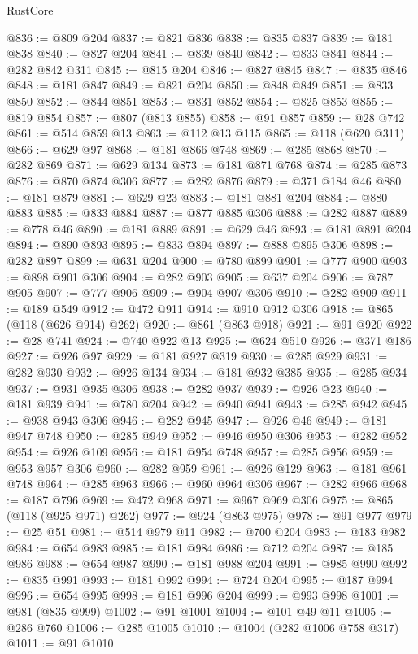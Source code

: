 \begin{lexlean}{RustCore}
\begin{coremodule}
@836 := @809 @204
@837 := @821 @836
@838 := @835 @837
@839 := @181 @838
@840 := @827 @204
@841 := @839 @840
@842 := @833 @841
@844 := @282 @842 @311
@845 := @815 @204
@846 := @827 @845
@847 := @835 @846
@848 := @181 @847
@849 := @821 @204
@850 := @848 @849
@851 := @833 @850
@852 := @844 @851
@853 := @831 @852
@854 := @825 @853
@855 := @819 @854
@857 := @807 (@813 @855)
@858 := @91 @857
@859 := @28 @742
@861 := @514 @859 @13
@863 := @112 @13 @115
@865 := @118 (@620 @311)
@866 := @629 @97
@868 := @181 @866 @748
@869 := @285 @868
@870 := @282 @869
@871 := @629 @134
@873 := @181 @871 @768
@874 := @285 @873
@876 := @870 @874 @306
@877 := @282 @876
@879 := @371 @184 @46
@880 := @181 @879
@881 := @629 @23
@883 := @181 @881 @204
@884 := @880 @883
@885 := @833 @884
@887 := @877 @885 @306
@888 := @282 @887
@889 := @778 @46
@890 := @181 @889
@891 := @629 @46
@893 := @181 @891 @204
@894 := @890 @893
@895 := @833 @894
@897 := @888 @895 @306
@898 := @282 @897
@899 := @631 @204
@900 := @780 @899
@901 := @777 @900
@903 := @898 @901 @306
@904 := @282 @903
@905 := @637 @204
@906 := @787 @905
@907 := @777 @906
@909 := @904 @907 @306
@910 := @282 @909
@911 := @189 @549
@912 := @472 @911
@914 := @910 @912 @306
@918 := @865 (@118 (@626 @914) @262)
@920 := @861 (@863 @918)
@921 := @91 @920
@922 := @28 @741
@924 := @740 @922 @13
@925 := @624 @510
@926 := @371 @186
@927 := @926 @97
@929 := @181 @927 @319
@930 := @285 @929
@931 := @282 @930
@932 := @926 @134
@934 := @181 @932 @385
@935 := @285 @934
@937 := @931 @935 @306
@938 := @282 @937
@939 := @926 @23
@940 := @181 @939
@941 := @780 @204
@942 := @940 @941
@943 := @285 @942
@945 := @938 @943 @306
@946 := @282 @945
@947 := @926 @46
@949 := @181 @947 @748
@950 := @285 @949
@952 := @946 @950 @306
@953 := @282 @952
@954 := @926 @109
@956 := @181 @954 @748
@957 := @285 @956
@959 := @953 @957 @306
@960 := @282 @959
@961 := @926 @129
@963 := @181 @961 @748
@964 := @285 @963
@966 := @960 @964 @306
@967 := @282 @966
@968 := @187 @796
@969 := @472 @968
@971 := @967 @969 @306
@975 := @865 (@118 (@925 @971) @262)
@977 := @924 (@863 @975)
@978 := @91 @977
@979 := @25 @51
@981 := @514 @979 @11
@982 := @700 @204
@983 := @183 @982
@984 := @654 @983
@985 := @181 @984
@986 := @712 @204
@987 := @185 @986
@988 := @654 @987
@990 := @181 @988 @204
@991 := @985 @990
@992 := @835 @991
@993 := @181 @992
@994 := @724 @204
@995 := @187 @994
@996 := @654 @995
@998 := @181 @996 @204
@999 := @993 @998
@1001 := @981 (@835 @999)
@1002 := @91 @1001
@1004 := @101 @49 @11
@1005 := @286 @760
@1006 := @285 @1005
@1010 := @1004 (@282 @1006 @758 @317)
@1011 := @91 @1010

\end{coremodule}
\end{lexlean}
